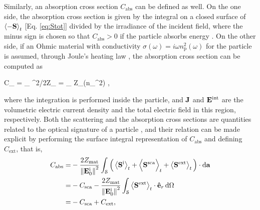 Similarly, an absorption cross section $C_\text{abs}$ can be defined as well. On the one side, the absorption cross section is given by the integral on a closed surface of \textcolor{red}{$\ev{-\vb{S}}_t$}  [Eq. \eqref{eq:Stot}] divided by the irradiance of the incident field, where the minus sign is chosen so that $C_\text{abs}>0$ if the particle absorbs energy  \cite{bohren_absorption_1983}. On the other side, if an Ohmic material with conductivity $\sigma(\omega) = i\omega n_\text{p}^2(\omega)$ \cite{jackson_classical_1999} for the particle is assumed, through Joule's heating law \cite{tsang_scattering_2000}, the absorption cross section can be computed as
%
%
%
%
%
%
 \begin{tcolorbox}[title = Ohmic Particle - Absorption Cross Section,	ams align, breakable]
 	C_ =	 \int_ 
 									{^2/2Z_}
				= \int_ \omega Z_\Im(n_^2)  ,
 \label{eq:Cabs}
 \end{tcolorbox}%
%
\noindent
where the integration is performed inside the particle, and $\vb{J}$  and $\vb{E}^\text{int}$ are the volumetric electric current density and the total electric field in this region, respectively. Both the  scattering and the absorption cross sections are quantities related to the optical signature of a particle \cite{pellarin_forward_2019}, and their relation can be made explicit by performing the surface integral representation of $C_\text{abs}$ and defining $C_\text{ext}$, that is,
%
\begin{align}
C_\text{abs} = & - \frac{2Z_\text{mat}}{\norm{\vb{E}^\text{i}_0}^2}\int_\mathcal{S}
                        \Big(
                                \ev{\vb{S}^\text{i}}_t + \Bigl\langle\vb{S}^\text{sca}\Bigr\rangle_t + \ev{\vb{S}^\text{ext}}_t
                        \Big)\cdot\dd{\vb{a}}
					\notag \\
			=  & - C_\text{sca} - \frac{2Z_\text{mat}}{\norm{\vb{E}_0^\text{i}}^2}\int_\mathcal{S}
                        \ev{\vb{S}^\text{ext}}_t\cdot \vu{e}_r\dd{\Omega}
					\notag \\
			= & -C_\text{sca} + C_\text{ext},
\label{eq:CabsScaInt}
\end{align}
